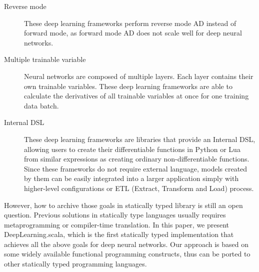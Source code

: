 \begin{description}

  \item[Reverse mode] These deep learning frameworks perform reverse mode AD instead of forward mode, as forward mode AD does not scale well for deep neural networks.

  \item[Multiple trainable variable] Neural networks are composed of multiple layers. Each layer contains their own trainable variables. These deep learning frameworks are able to calculate the derivatives of all trainable variables at once for one training data batch.

  \item[Internal DSL\cite{fowler2010domain}] These deep learning frameworks are libraries that provide an Internal DSL, allowing users to create their differentiable functions in Python or Lua from similar expressions as creating ordinary non-differentiable functions. Since these frameworks do not require external language, models created by them can be easily integrated into a larger application simply with higher-level configurations\cite{chollet2015keras} or ETL (Extract, Transform and Load) process.



\end{description}



However, how to archive those goals in statically typed library is still an open question. Previous solutions in statically type languages usually requires metaprogramming or compiler-time translation. In this paper, we present DeepLearning.scala, which is the first statically typed implementation that achieves all the above goals for deep neural networks. Our approach is based on some widely available functional programming constructs, thus can be ported to other statically typed programming languages.

